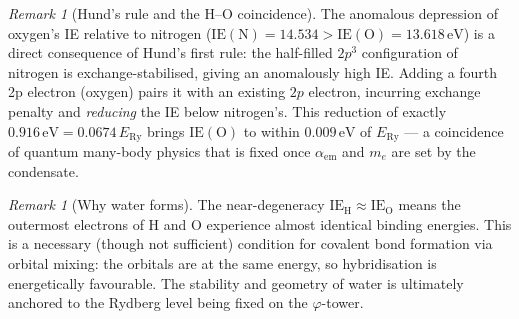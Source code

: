 \documentclass[11pt,a4paper]{article}
\theoremstyle{definition}
\theoremstyle{remark}
\newtheorem{remark}[theorem]{Remark}
\newcommand{\vp}{\varphi}
\newcommand{\ERy}{E_{\mathrm{Ry}}}
\newcommand{\aem}{\alpha_{\mathrm{em}}}
\newcommand{\IE}{\mathrm{IE}}
\begin{document}
\begin{remark}[Hund's rule and the H--O coincidence]
\label{P11:rem:hund_HO_coincidence}
The anomalous depression of oxygen's IE relative to nitrogen
($\IE(\mathrm{N}) = 14.534 > \IE(\mathrm{O}) = 13.618\,\mathrm{eV}$)
is a direct consequence of Hund's first rule: the half-filled $2p^3$
configuration of nitrogen is exchange-stabilised, giving an anomalously
high IE.  Adding a fourth 2p electron (oxygen) pairs it with an
existing $2p$ electron, incurring exchange penalty and
\emph{reducing} the IE below nitrogen's.
This reduction of exactly $0.916\,\mathrm{eV} = 0.0674\,\ERy$ brings
$\IE(\mathrm{O})$ to within $0.009\,\mathrm{eV}$ of $\ERy$
--- a coincidence of quantum many-body physics that is fixed once
$\aem$ and $m_e$ are set by the condensate.
\end{remark}


\begin{remark}[Why water forms]
\label{P11:rem:why_water_forms}
The near-degeneracy $\IE_\mathrm{H} \approx \IE_\mathrm{O}$ means the
outermost electrons of H and O experience almost identical
binding energies.  This is a necessary (though not sufficient)
condition for covalent bond formation via orbital mixing:
the orbitals are at the same energy, so hybridisation
is energetically favourable.  The stability and geometry of
water is ultimately anchored to the Rydberg level being fixed
on the $\vp$-tower.
\end{remark}
\end{document}
